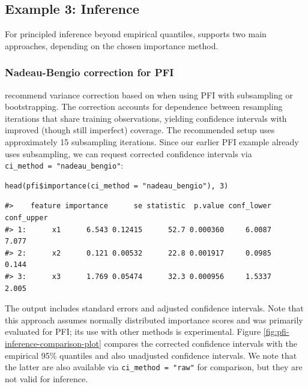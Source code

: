 \subsection{Example 3: Inference}\label{example-3-inference}

For principled inference beyond empirical quantiles,  supports two main approaches, depending on the chosen importance method.

\subsubsection{Nadeau-Bengio correction for PFI}\label{nadeau-bengio-correction-for-pfi}

\citet{molnar2023relatingpartialc} recommend variance correction based on \citet{nadeau2003inferencegeneralization} when using PFI with subsampling or bootstrapping.
The correction accounts for dependence between resampling iterations that share training observations, yielding confidence intervals with improved (though still imperfect) coverage.
The recommended setup uses approximately 15 subsampling iterations.
Since our earlier PFI example already uses subsampling, we can request corrected confidence intervals via \texttt{ci\_method\ =\ "nadeau\_bengio"}:

\begin{verbatim}
head(pfi$importance(ci_method = "nadeau_bengio"), 3)
\end{verbatim}

\begin{verbatim}
#>    feature importance      se statistic  p.value conf_lower conf_upper
#> 1:      x1      6.543 0.12415      52.7 0.000360     6.0087      7.077
#> 2:      x2      0.121 0.00532      22.8 0.001917     0.0985      0.144
#> 3:      x3      1.769 0.05474      32.3 0.000956     1.5337      2.005
\end{verbatim}

The output includes standard errors and adjusted confidence intervals.
Note that this approach assumes normally distributed importance scores and was primarily evaluated for PFI; its use with other methods is experimental.
Figure \ref{fig:pfi-inference-comparison-plot} compares the corrected confidence intervals with the empirical 95\% quantiles and also unadjusted confidence intervals.
We note that the latter are also available via \texttt{ci\_method\ =\ "raw"} for comparison, but they are not valid for inference.

